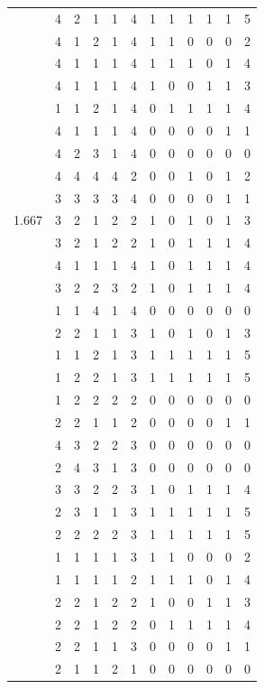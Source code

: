 \documentclass[]{msu-thesis}
\theoremstyle{definition}
\theoremstyle{definition}
\theoremstyle{definition}
\theoremstyle{remark}
\begin{document}
\begin{table}
{\begin{tabular}[t]{rrrrrrrrrrrr}
 & 4 & 2 & 1 & 1 & 4 & 1 & 1 & 1 & 1 & 1 & 5\\
 & 4 & 1 & 2 & 1 & 4 & 1 & 1 & 0 & 0 & 0 & 2\\
 & 4 & 1 & 1 & 1 & 4 & 1 & 1 & 1 & 0 & 1 & 4\\
 & 4 & 1 & 1 & 1 & 4 & 1 & 0 & 0 & 1 & 1 & 3\\
 & 1 & 1 & 2 & 1 & 4 & 0 & 1 & 1 & 1 & 1 & 4\\
 & 4 & 1 & 1 & 1 & 4 & 0 & 0 & 0 & 0 & 1 & 1\\
 & 4 & 2 & 3 & 1 & 4 & 0 & 0 & 0 & 0 & 0 & 0\\
 & 4 & 4 & 4 & 4 & 2 & 0 & 0 & 1 & 0 & 1 & 2\\
 & 3 & 3 & 3 & 3 & 4 & 0 & 0 & 0 & 0 & 1 & 1\\
1.667 & 3 & 2 & 1 & 2 & 2 & 1 & 0 & 1 & 0 & 1 & 3\\
 & 3 & 2 & 1 & 2 & 2 & 1 & 0 & 1 & 1 & 1 & 4\\
 & 4 & 1 & 1 & 1 & 4 & 1 & 0 & 1 & 1 & 1 & 4\\
 & 3 & 2 & 2 & 3 & 2 & 1 & 0 & 1 & 1 & 1 & 4\\
 & 1 & 1 & 4 & 1 & 4 & 0 & 0 & 0 & 0 & 0 & 0\\
 & 2 & 2 & 1 & 1 & 3 & 1 & 0 & 1 & 0 & 1 & 3\\
 & 1 & 1 & 2 & 1 & 3 & 1 & 1 & 1 & 1 & 1 & 5\\
 & 1 & 2 & 2 & 1 & 3 & 1 & 1 & 1 & 1 & 1 & 5\\
 & 1 & 2 & 2 & 2 & 2 & 0 & 0 & 0 & 0 & 0 & 0\\
 & 2 & 2 & 1 & 1 & 2 & 0 & 0 & 0 & 0 & 1 & 1\\
 & 4 & 3 & 2 & 2 & 3 & 0 & 0 & 0 & 0 & 0 & 0\\
 & 2 & 4 & 3 & 1 & 3 & 0 & 0 & 0 & 0 & 0 & 0\\
 & 3 & 3 & 2 & 2 & 3 & 1 & 0 & 1 & 1 & 1 & 4\\
 & 2 & 3 & 1 & 1 & 3 & 1 & 1 & 1 & 1 & 1 & 5\\
 & 2 & 2 & 2 & 2 & 3 & 1 & 1 & 1 & 1 & 1 & 5\\
 & 1 & 1 & 1 & 1 & 3 & 1 & 1 & 0 & 0 & 0 & 2\\
 & 1 & 1 & 1 & 1 & 2 & 1 & 1 & 1 & 0 & 1 & 4\\
 & 2 & 2 & 1 & 2 & 2 & 1 & 0 & 0 & 1 & 1 & 3\\
 & 2 & 2 & 1 & 2 & 2 & 0 & 1 & 1 & 1 & 1 & 4\\
 & 2 & 2 & 1 & 1 & 3 & 0 & 0 & 0 & 0 & 1 & 1\\
 & 2 & 1 & 1 & 2 & 1 & 0 & 0 & 0 & 0 & 0 & 0\\

\end{tabular}}
\end{table}
\end{document}
